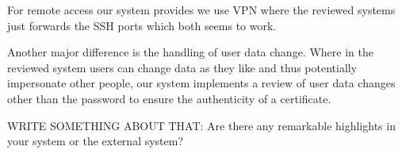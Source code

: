 \documentclass{article}
\begin{document}
For remote access our system provides we use VPN where the reviewed systems just forwards the SSH ports which both seems to work.

Another major difference is the handling of user data change. Where in the reviewed system users can change data as they like and thus potentially impersonate other people, our system implements a review of user data changes other than the password to ensure the authenticity of a certificate.

WRITE SOMETHING ABOUT THAT: Are there any remarkable highlights in your system or the external system?
\end{document}
